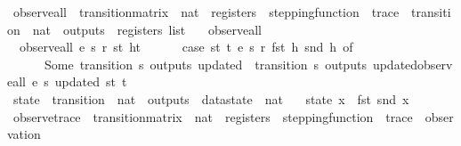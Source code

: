\begin{isabellebody}
%
\isadelimproof
\isanewline
%
\endisadelimproof
\isanewline
{}\isamarkupfalse%
\ observe{\isacharunderscore}all\ {\isacharcolon}{\isacharcolon}\ {\isachardoublequoteopen}transition{\isacharunderscore}matrix\ {\isasymRightarrow}\ nat\ {\isasymRightarrow}\ registers\ {\isasymRightarrow}\ stepping{\isacharunderscore}function\ {\isasymRightarrow}\ trace\ {\isasymRightarrow}\ {\isacharparenleft}transition\ {\isasymtimes}\ nat\ {\isasymtimes}\ outputs\ {\isasymtimes}\ registers{\isacharparenright}\ list{\isachardoublequoteclose}\ \isanewline
\ \ {\isachardoublequoteopen}observe{\isacharunderscore}all\ {\isacharunderscore}\ {\isacharunderscore}\ {\isacharunderscore}\ {\isacharunderscore}\ {\isacharbrackleft}{\isacharbrackright}\ {\isacharequal}\ {\isacharbrackleft}{\isacharbrackright}{\isachardoublequoteclose}\ {\isacharbar}\isanewline
\ \ {\isachardoublequoteopen}observe{\isacharunderscore}all\ e\ s\ r\ st\ {\isacharparenleft}h{\isacharhash}t{\isacharparenright}\ \ {\isacharequal}\isanewline
\ \ \ \ {\isacharparenleft}case\ {\isacharparenleft}st\ t\ e\ s\ r\ {\isacharparenleft}fst\ h{\isacharparenright}\ {\isacharparenleft}snd\ h{\isacharparenright}{\isacharparenright}\ of\isanewline
\ \ \ \ \ \ {\isacharparenleft}Some\ {\isacharparenleft}transition{\isacharcomma}\ s{\isacharprime}{\isacharcomma}\ outputs{\isacharcomma}\ updated{\isacharparenright}{\isacharparenright}\ {\isasymRightarrow}\ {\isacharparenleft}{\isacharparenleft}{\isacharparenleft}transition{\isacharcomma}\ s{\isacharprime}{\isacharcomma}\ outputs{\isacharcomma}\ updated{\isacharparenright}{\isacharhash}{\isacharparenleft}observe{\isacharunderscore}all\ e\ s{\isacharprime}\ updated\ st\ t{\isacharparenright}{\isacharparenright}{\isacharparenright}\ {\isacharbar}\isanewline
\ \ \ \ \ \ {\isacharunderscore}\ {\isasymRightarrow}\ {\isacharbrackleft}{\isacharbrackright}\isanewline
\ \ \ \ {\isacharparenright}{\isachardoublequoteclose}\isanewline
\isanewline
{}\isamarkupfalse%
\ state\ {\isacharcolon}{\isacharcolon}\ {\isachardoublequoteopen}{\isacharparenleft}transition\ {\isasymtimes}\ nat\ {\isasymtimes}\ outputs\ {\isasymtimes}\ datastate{\isacharparenright}\ {\isasymRightarrow}\ nat{\isachardoublequoteclose}\ \isanewline
\ \ {\isachardoublequoteopen}state\ x\ {\isasymequiv}\ fst\ {\isacharparenleft}snd\ x{\isacharparenright}{\isachardoublequoteclose}\isanewline
\isanewline
{}\isamarkupfalse%
\ observe{\isacharunderscore}trace\ {\isacharcolon}{\isacharcolon}\ {\isachardoublequoteopen}transition{\isacharunderscore}matrix\ {\isasymRightarrow}\ nat\ {\isasymRightarrow}\ registers\ {\isasymRightarrow}\ stepping{\isacharunderscore}function\ {\isasymRightarrow}\ trace\ {\isasymRightarrow}\ observation{\isachardoublequoteclose}\ \isanewline

\end{isabellebody}
